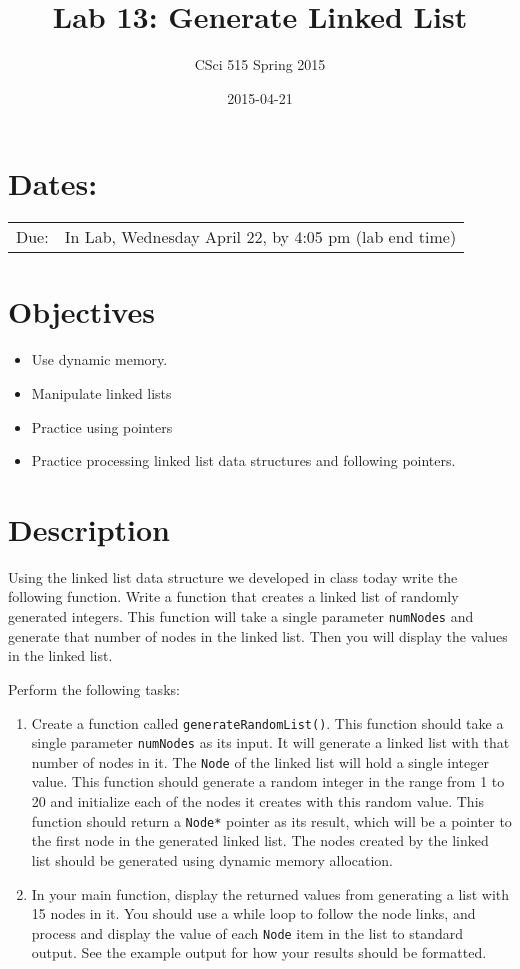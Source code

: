 \documentclass[11pt]{article}
\title{Lab 13: Generate Linked List}
\author{CSci 515 Spring 2015}
\date{2015-04-21}
\begin{document}
\maketitle


\section*{Dates:}
\label{sec-1}


\begin{center}
\begin{tabular}{ll}
 Due:  &  In Lab, Wednesday April 22, by 4:05 pm (lab end time)  \\
\end{tabular}
\end{center}
\section*{Objectives}
\label{sec-2}

\begin{itemize}
\item Use dynamic memory.
\item Manipulate linked lists
\item Practice using pointers
\item Practice processing linked list data structures and following pointers.
\end{itemize}
\section*{Description}
\label{sec-3}

Using the linked list data structure we developed in class today write
the following function.  Write a function that creates
a linked list of randomly generated integers.  This function
will take a single parameter \verb~numNodes~ and generate that number of nodes
in the linked list.  Then you will display the values in the linked
list.

Perform the following tasks:

\begin{enumerate}
\item Create a function called \verb~generateRandomList()~.  This function
   should take a single parameter \verb~numNodes~ as its input.  It
   will generate a linked list with that number of nodes in it.  The
   \verb~Node~ of the linked list will hold a single integer value.  This
   function should generate a random integer in the range from 1 to
   20 and initialize each of the nodes it creates with this random
   value.  This function should return a \verb~Node*~ pointer as its
   result, which will be a pointer to the first node in the
   generated linked list.  The nodes created by the linked list should
   be generated using dynamic memory allocation.
\item In your main function, display the returned values from generating
   a list with 15 nodes in it.  You should use a while loop to
   follow the node links, and process and display the value of each
   \verb~Node~ item in the list to standard output.  See the example 
   output for how your results should be formatted.
\end{enumerate}
\end{document}
